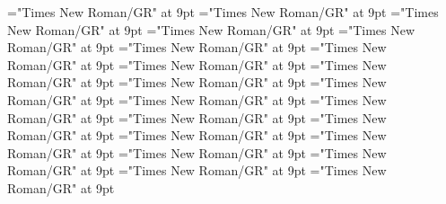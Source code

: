 \documentclass[gps1,twoside]{article}
\begin{document}
\font\spanspanabbreviationsemanticdomainsemanticdomainssensesensessensesensessubentrysubentriesentrybefore="Times New Roman/GR" at 9pt
\font\spanabbreviationsemanticdomainsemanticdomainssensesensessensesensessubentrysubentriesentrylastchildafter="Times New Roman/GR" at 9pt
\font\spanspannamesemanticdomainsemanticdomainssensesensessensesensessubentrysubentriesentrybefore="Times New Roman/GR" at 9pt
\font\academicdomainacademicdomainacademicdomainssensesensessensesensessubentrysubentriesentrybefore="Times New Roman/GR" at 9pt
\font\academicdomainssensesensessensesensessubentrysubentriesentrybefore="Times New Roman/GR" at 9pt
\font\academicdomainssensesensessensesensessubentrysubentriesentryafter="Times New Roman/GR" at 9pt
\font\spanspanabbreviationacademicdomainacademicdomainssensesensessensesensessubentrysubentriesentrybefore="Times New Roman/GR" at 9pt
\font\spanspannameacademicdomainacademicdomainssensesensessensesensessubentrysubentriesentrybefore="Times New Roman/GR" at 9pt
\font\spannameacademicdomainacademicdomainssensesensessensesensessubentrysubentriesentryfirstchildbefore="Times New Roman/GR" at 9pt
\font\spannameacademicdomainacademicdomainssensesensessensesensessubentrysubentriesentrylastchildafter="Times New Roman/GR" at 9pt
\font\usageusageusagessensesensessensesensessubentrysubentriesentrybefore="Times New Roman/GR" at 9pt
\font\usagessensesensessensesensessubentrysubentriesentrybefore="Times New Roman/GR" at 9pt
\font\usagessensesensessensesensessubentrysubentriesentryafter="Times New Roman/GR" at 9pt
\font\spanspanabbreviationusageusagessensesensessensesensessubentrysubentriesentrybefore="Times New Roman/GR" at 9pt
\font\visiblecomplexformbackrefvisiblecomplexformbackrefvisiblecomplexformbackrefssensesensessensesensessubentrysubentriesentrybefore="Times New Roman/GR" at 9pt
\font\visiblecomplexformbackrefssensesensessensesensessubentrysubentriesentryafter="Times New Roman/GR" at 9pt
\font\complexformtypesvisiblecomplexformbackrefvisiblecomplexformbackrefssensesensessensesensessubentrysubentriesentryafter="Times New Roman/GR" at 9pt
\font\spanspanreverseabbrcomplexformtypecomplexformtypesvisiblecomplexformbackrefvisiblecomplexformbackrefssensesensessensesensessubentrysubentriesentrybefore="Times New Roman/GR" at 9pt
\font\spanspanheadwordvisiblecomplexformbackrefvisiblecomplexformbackrefssensesensessensesensessubentrysubentriesentrybefore="Times New Roman/GR" at 9pt
\font\spanspanowningentrysummarydefinitionvisiblecomplexformbackrefvisiblecomplexformbackrefssensesensessensesensessubentrysubentriesentrybefore="Times New Roman/GR" at 9pt
\font\spanowningentrysummarydefinitionvisiblecomplexformbackrefvisiblecomplexformbackrefssensesensessensesensessubentrysubentriesentryfirstchildbefore="Times New Roman/GR" at 9pt
\end{document}

